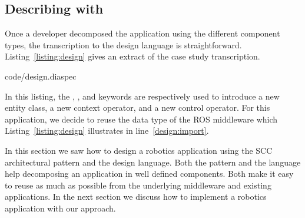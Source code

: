 \subsection{Describing with \diaspec{}}

Once a developer decomposed the application using the different
component types, the transcription to the \diaspec{} design language
is straightforward. Listing~\ref{listing:design} gives an extract of
the case study transcription.

%
{code/design.diaspec}

In this listing, the , , and 
keywords are respectively used to introduce a new entity class, a new
context operator, and a new control operator. For this application, we
decide to reuse the  data type of the ROS middleware which
Listing~\ref{listing:design} illustrates in line~\ref{design:import}.


In this section we saw how to design a robotics application using
the SCC architectural pattern and the \diaspec{} design language. Both
the pattern and the language help decomposing an application in well
defined components. Both make it easy to reuse as much as possible
from the underlying middleware and existing applications. In the next
section we discuss how to implement a robotics application with our
approach.


